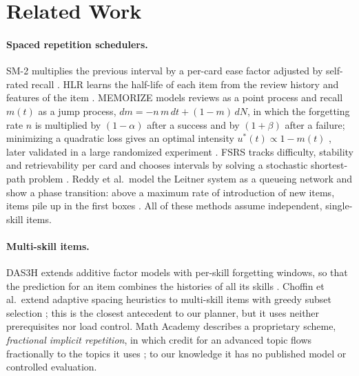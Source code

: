 \documentclass[runningheads]{llncs}
\begin{document}
\section{Related Work}

\paragraph{Spaced repetition schedulers.} SM-2 multiplies the previous interval by a per-card ease factor adjusted by self-rated recall \cite{wozniak1990}. HLR learns the half-life of each item from the review history and features of the item \cite{settles2016}. MEMORIZE models reviews as a point process and recall $m(t)$ as a jump process, $dm=-n\,m\,dt+(1-m)\,dN$, in which the forgetting rate $n$ is multiplied by $(1-\alpha)$ after a success and by $(1+\beta)$ after a failure; minimizing a quadratic loss gives an optimal intensity $u^\ast(t)\propto 1-m(t)$ \cite{tabibian2019}, later validated in a large randomized experiment \cite{upadhyay2021}. FSRS tracks difficulty, stability and retrievability per card and chooses intervals by solving a stochastic shortest-path problem \cite{ye2022,su2023}. Reddy et al.\ model the Leitner system as a queueing network and show a phase transition: above a maximum rate of introduction of new items, items pile up in the first boxes \cite{reddy2016}. All of these methods assume independent, single-skill items.

\paragraph{Multi-skill items.} DAS3H extends additive factor models with per-skill forgetting windows, so that the prediction for an item combines the histories of all its skills \cite{choffin2019}. Choffin et al.\ extend adaptive spacing heuristics to multi-skill items with greedy subset selection \cite{choffin2021}; this is the closest antecedent to our planner, but it uses neither prerequisites nor load control. Math Academy describes a proprietary scheme, \emph{fractional implicit repetition}, in which credit for an advanced topic flows fractionally to the topics it uses \cite{skycak2023}; to our knowledge it has no published model or controlled evaluation.
\end{document}
